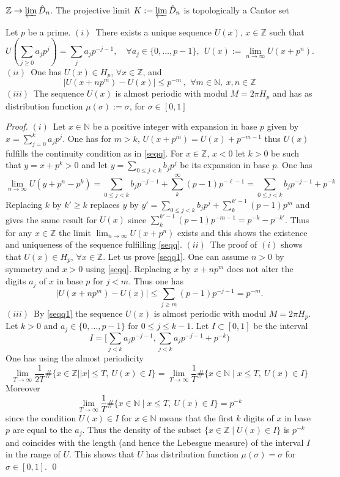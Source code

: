 \documentclass[graybox, envcountsect%
]{svmult}
\def\N{{\mathbb N}}
\def\Z{{\mathbb Z}}
\def\qqq{\,,\,~\forall}
\renewcommand{\projlim}{\varprojlim}
\begin{document}
$\Z\to \projlim \hat D_n$. The projective limit $K:=\projlim \hat D_n$  is topologically a Cantor set
\begin{lemma}\label{exampl} Let $p$ be a prime. \newline
$(i)$~There exists a unique sequence $U(x)$, $x\in \Z$ such that 
\begin{equation}\label{seqq}
	U(\sum_{j\geq 0} a_jp^j)=\sum_j a_jp^{-j-1},\quad \forall a_j\in \{0,\ldots, p-1\}, \ \ U(x):=\lim_{n\to \infty} U(x+p^n).
\end{equation}
$(ii)$~One has $U(x)\in H_p$, $\forall x\in \Z$, and
\begin{equation}\label{seqq1}
	\vert U(x+np^m)-U(x)\vert \leq p^{-m}\qqq m\in \N, \ x,n\in \Z
\end{equation}
$(iii)$~The  sequence $U(x)$ is almost periodic with modul $M=2\pi H_p$ 
	and has as distribution function $\mu(\sigma):=\sigma$, for $\sigma\in [0,1]$
\end{lemma}
\begin{proof} $(i)$~Let $x\in \N$ be a positive integer with expansion in base $p$ given by $x=\sum_{j= 0}^k a_jp^j$. One has for $m>k$, $U(x+p^m)=U(x)+p^{-m-1}$ thus $U(x)$ fulfills the continuity condition as in \eqref{seqq}. For $x\in \Z$, $x<0$ let $k>0$ be such that $y=x+p^k>0$ and let $y=\sum_{0\leq j<k} b_jp^j$ be its expansion in base $p$. One has 
$$
\lim_{n\to \infty} U(y+p^n-p^k)=\sum_{0\leq j<k} b_jp^{-j-1}+\sum_{k}^\infty (p-1)p^{-\ell-1}=\sum_{0\leq j<k} b_jp^{-j-1}+p^{-k}
$$
Replacing $k$ by  $k'\geq  k$ replaces $y$ by $y'=\sum_{0\leq j<k} b_jp^j+\sum_{k}^{k'-1}(p-1)p^m$  and gives the same result for $U(x)$ since $\sum_{k}^{k'-1}(p-1)p^{-m-1}=p^{-k}-p^{-k'}$. Thus for any $x\in \Z$ the limit $\lim_{n\to \infty} U(x+p^n)$ exists and  this shows the existence and uniqueness of the sequence fulfilling \eqref{seqq}.\newline
$(ii)$~The proof of $(i)$ shows that  $U(x)\in H_p$, $\forall x\in \Z$. Let us prove 
 \eqref{seqq1}. One can assume $n>0$ by symmetry and $x>0$ using \eqref{seqq}. 
Replacing $x$ by $x+np^m$ does not alter the  digits $a_j$ of 
$x$  in base $p$ for  $j<m$. Thus one has
$$
\vert U(x+np^m)-U(x)\vert \leq \sum_{j\geq m} (p-1)p^{-j-1}=p^{-m}.
$$
$(iii)$~By \eqref{seqq1} the  sequence $U(x)$ is almost periodic with modul $M=2\pi H_p$. 
Let $k>0$ and $a_j\in \{0,\ldots, p-1\}$ for $0\leq j\leq k-1$. Let $I\subset [0,1]$ be the interval
$$
I=[\sum_{j<k} a_jp^{-j-1},\sum_{j<k} a_jp^{-j-1}+p^{-k})
$$
One has using the almost periodicity
$$
\lim_{T\to \infty} \frac{1}{2T}\# \{x\in \Z \mid \vert x\vert\leq T, \ U(x)\in I\}
=\lim_{T\to \infty} \frac{1}{T}\# \{x\in \N \mid x\leq T, \ U(x)\in I\}
$$
Moreover 
$$
\lim_{T\to \infty} \frac{1}{T}\# \{x\in \N \mid x\leq T, \ U(x)\in I\}=p^{-k}
$$
since the condition $U(x)\in I$ for $x\in \N$ means that the first $k$ digits of $x$ in base $p$ are equal to the $a_j$. Thus the density of the subset $\{x\in \Z\mid U(x)\in I\}$ is $p^{-k}$ and coincides with the length (and hence the  Lebesgue measure) of the interval $I$ in the range of $U$. This shows that $U$ has distribution function $\mu(\sigma)=\sigma$ for $\sigma\in [0,1]$. \qed\end{proof} 
 
\end{document}
